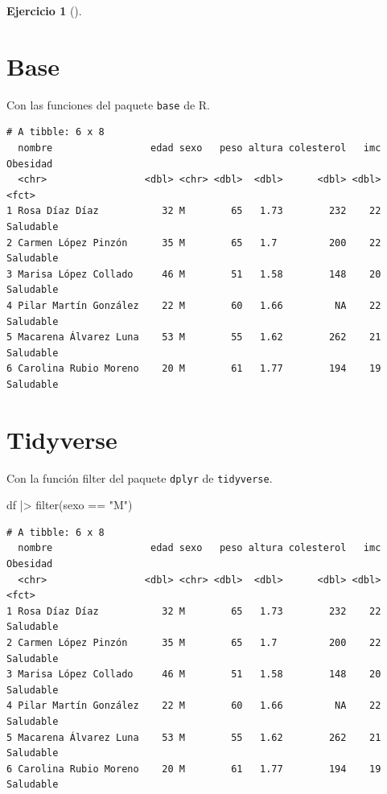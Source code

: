 \documentclass[
  a4paper,
]{scrreport}
\newenvironment{Shaded}{\begin{snugshade}}{\end{snugshade}}
\newcommand{\FunctionTok}[1]{\textcolor[rgb]{0.28,0.35,0.67}{#1}}
\newcommand{\NormalTok}[1]{\textcolor[rgb]{0.00,0.23,0.31}{#1}}
\newcommand{\SpecialCharTok}[1]{\textcolor[rgb]{0.37,0.37,0.37}{#1}}
\newcommand{\StringTok}[1]{\textcolor[rgb]{0.13,0.47,0.30}{#1}}
\theoremstyle{definition}
\newtheorem{exercise}{Ejercicio}[chapter]
\theoremstyle{remark}
\begin{document}
\begin{exercise}[]
\begin{enumerate}
\begin{tcolorbox}
  \section{Base}

  Con las funciones del paquete \texttt{base} de R.

\begin{Shaded}
\end{Shaded}

\begin{verbatim}
# A tibble: 6 x 8
  nombre                 edad sexo   peso altura colesterol   imc Obesidad 
  <chr>                 <dbl> <chr> <dbl>  <dbl>      <dbl> <dbl> <fct>    
1 Rosa Díaz Díaz           32 M        65   1.73        232    22 Saludable
2 Carmen López Pinzón      35 M        65   1.7         200    22 Saludable
3 Marisa López Collado     46 M        51   1.58        148    20 Saludable
4 Pilar Martín González    22 M        60   1.66         NA    22 Saludable
5 Macarena Álvarez Luna    53 M        55   1.62        262    21 Saludable
6 Carolina Rubio Moreno    20 M        61   1.77        194    19 Saludable
\end{verbatim}

  \section{Tidyverse}

  Con la función filter del paquete \texttt{dplyr} de
  \texttt{tidyverse}.

\begin{Shaded}
\begin{Highlighting}[]
\NormalTok{df }\SpecialCharTok{|\textgreater{}} \FunctionTok{filter}\NormalTok{(sexo }\SpecialCharTok{==} \StringTok{"M"}\NormalTok{)}
\end{Highlighting}
\end{Shaded}

\begin{verbatim}
# A tibble: 6 x 8
  nombre                 edad sexo   peso altura colesterol   imc Obesidad 
  <chr>                 <dbl> <chr> <dbl>  <dbl>      <dbl> <dbl> <fct>    
1 Rosa Díaz Díaz           32 M        65   1.73        232    22 Saludable
2 Carmen López Pinzón      35 M        65   1.7         200    22 Saludable
3 Marisa López Collado     46 M        51   1.58        148    20 Saludable
4 Pilar Martín González    22 M        60   1.66         NA    22 Saludable
5 Macarena Álvarez Luna    53 M        55   1.62        262    21 Saludable
6 Carolina Rubio Moreno    20 M        61   1.77        194    19 Saludable
\end{verbatim}


\end{tcolorbox}
\end{enumerate}
\end{exercise}
\end{document}
